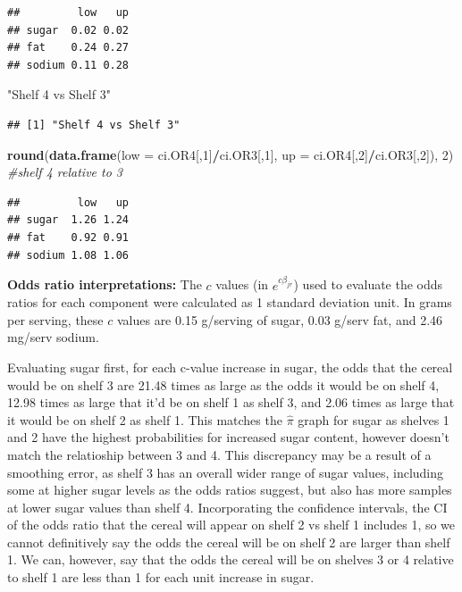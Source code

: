\documentclass[11pt,]{article}
\newenvironment{Shaded}{\begin{snugshade}}{\end{snugshade}}
\newcommand{\KeywordTok}[1]{\textcolor[rgb]{0.13,0.29,0.53}{\textbf{#1}}}
\newcommand{\DataTypeTok}[1]{\textcolor[rgb]{0.13,0.29,0.53}{#1}}
\newcommand{\DecValTok}[1]{\textcolor[rgb]{0.00,0.00,0.81}{#1}}
\newcommand{\StringTok}[1]{\textcolor[rgb]{0.31,0.60,0.02}{#1}}
\newcommand{\CommentTok}[1]{\textcolor[rgb]{0.56,0.35,0.01}{\textit{#1}}}
\newcommand{\OperatorTok}[1]{\textcolor[rgb]{0.81,0.36,0.00}{\textbf{#1}}}
\newcommand{\NormalTok}[1]{#1}
\begin{document}
\begin{verbatim}
##         low   up
## sugar  0.02 0.02
## fat    0.24 0.27
## sodium 0.11 0.28
\end{verbatim}

\begin{Shaded}
\begin{Highlighting}[]
\StringTok{"Shelf 4 vs Shelf 3"}
\end{Highlighting}
\end{Shaded}

\begin{verbatim}
## [1] "Shelf 4 vs Shelf 3"
\end{verbatim}

\begin{Shaded}
\begin{Highlighting}[]
\KeywordTok{round}\NormalTok{(}\KeywordTok{data.frame}\NormalTok{(}\DataTypeTok{low =}\NormalTok{ ci.OR4[,}\DecValTok{1}\NormalTok{]}\OperatorTok{/}\NormalTok{ci.OR3[,}\DecValTok{1}\NormalTok{], }\DataTypeTok{up =}\NormalTok{ ci.OR4[,}\DecValTok{2}\NormalTok{]}\OperatorTok{/}\NormalTok{ci.OR3[,}\DecValTok{2}\NormalTok{]), }\DecValTok{2}\NormalTok{) }\CommentTok{#shelf 4 relative to 3}
\end{Highlighting}
\end{Shaded}

\begin{verbatim}
##         low   up
## sugar  1.26 1.24
## fat    0.92 0.91
## sodium 1.08 1.06
\end{verbatim}

\textbf{Odds ratio interpretations:} The \(c\) values (in
\(e^{c\beta_{jr}}\)) used to evaluate the odds ratios for each component
were calculated as 1 standard deviation unit. In grams per serving,
these \(c\) values are 0.15 g/serving of sugar, 0.03 g/serv fat, and
2.46 mg/serv sodium.

Evaluating sugar first, for each c-value increase in sugar, the odds
that the cereal would be on shelf 3 are 21.48 times as large as the odds
it would be on shelf 4, 12.98 times as large that it'd be on shelf 1 as
shelf 3, and 2.06 times as large that it would be on shelf 2 as shelf 1.
This matches the \(\hat{\pi}\) graph for sugar as shelves 1 and 2 have
the highest probabilities for increased sugar content, however doesn't
match the relatioship between 3 and 4. This discrepancy may be a result
of a smoothing error, as shelf 3 has an overall wider range of sugar
values, including some at higher sugar levels as the odds ratios
suggest, but also has more samples at lower sugar values than shelf 4.
Incorporating the confidence intervals, the CI of the odds ratio that
the cereal will appear on shelf 2 vs shelf 1 includes 1, so we cannot
definitively say the odds the cereal will be on shelf 2 are larger than
shelf 1. We can, however, say that the odds the cereal will be on
shelves 3 or 4 relative to shelf 1 are less than 1 for each unit
increase in sugar.
\end{document}
